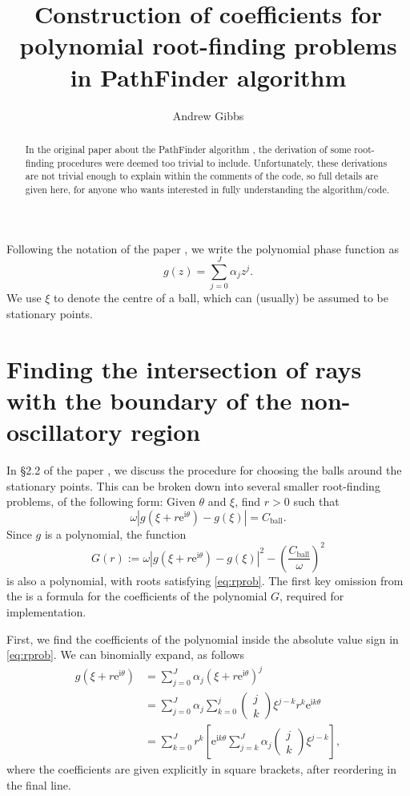 \documentclass[12pt]{article}
\title{Construction of coefficients for polynomial root-finding problems in PathFinder algorithm}
\author{Andrew Gibbs}
\newcommand{\re}{\mathrm{e}}
\newcommand{\ri}{\mathrm{i}}
\newcommand{\Cball}{C_{\mathrm{ball}}}
\begin{document}
	
	\maketitle
	
	\begin{abstract}
		In the original paper about the PathFinder algorithm \cite{PFpaper}, the derivation of some root-finding procedures were deemed too trivial to include. Unfortunately, these derivations are not trivial enough to explain within the comments of the code, so full details are given here, for anyone who wants interested in fully understanding the algorithm/code.
	\end{abstract}

Following the notation of the paper \cite{PFpaper}, we write the polynomial phase function as
\[
g(z) = \sum_{j=0}^J \alpha_j z^j.
\]
We use $\xi$ to denote the centre of a ball, which can (usually) be assumed to be stationary points.

\section{Finding the intersection of rays with the boundary of the non-oscillatory region}

In \S2.2 of the paper \cite{PFpaper}, we discuss the procedure for choosing the balls around the stationary points. This can be broken down into several smaller root-finding problems, of the following form: Given $\theta$ and $\xi$, find $r>0$ such that
\begin{equation}\label{eq:rprob}
\omega\left|g(\xi+r\re^{\ri \theta})-g(\xi)\right|=\Cball.
\end{equation}
Since $g$ is a polynomial, the function
\begin{equation}\label{eq:G}
G(r) := \omega\left|g(\xi+r\re^{\ri \theta})-g(\xi)\right|^2-\left(\frac{\Cball}{\omega}\right)^2
\end{equation}
is also a polynomial, with roots satisfying \eqref{eq:rprob}. The first key omission from the \cite[\S2.2]{PFpaper} is a formula for the coefficients of the polynomial $G$, required for implementation.

First, we find the coefficients of the polynomial inside the absolute value sign in \eqref{eq:rprob}. We can binomially expand, as follows
\begin{align}
	g(\xi+r\re^{\ri \theta}) &= \sum_{j=0}^J\alpha_j(\xi+r\re^{\ri\theta})^j\nonumber\\
	&=\sum_{j=0}^J\alpha_j\sum_{k=0}^j\left(\begin{array}{c}
		j\\k
	\end{array}\right)
	\xi^{j-k}r^k\re^{\ri k \theta}\nonumber\\
	&=\sum_{k=0}^J r^k\left[\re^{\ri k \theta}\sum_{j=k}^J \alpha_j\left(\begin{array}{c}
		j\\k
	\end{array}\right)
	\xi^{j-k}\right]\label{eq:polysplit},
\end{align}
where the coefficients are given explicitly in square brackets, after reordering in the final line.
\end{document}
